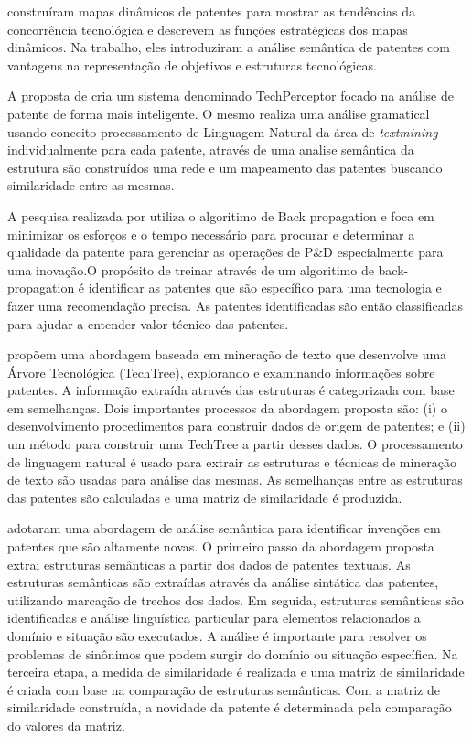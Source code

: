 \documentclass[12pt]{article}
\begin{document}
\cite{yoon2013identifying} construíram mapas dinâmicos de patentes para mostrar as tendências da concorrência tecnológica e descrevem as funções estratégicas dos mapas dinâmicos. Na trabalho, eles introduziram a análise semântica de patentes com vantagens na representação de objetivos e estruturas tecnológicas. 

A proposta de \citep{park2013patent} cria um sistema denominado TechPerceptor focado na análise de patente de forma mais inteligente. O mesmo realiza uma análise gramatical usando conceito processamento de Linguagem Natural da área de \textit{textmining} individualmente para cada patente, através de uma analise semântica da estrutura são construídos uma rede e um mapeamento das patentes buscando similaridade entre as mesmas.

A pesquisa realizada por \cite{trappey2013intelligent} utiliza o algoritimo de Back propagation e foca em
minimizar os esforços e o tempo necessário para procurar e determinar a qualidade da patente para gerenciar as operações de P\&D especialmente para uma inovação.O propósito de treinar através de um algoritimo de back-propagation é identificar as patentes que são
específico para uma tecnologia e fazer uma recomendação precisa.
As patentes identificadas são então classificadas para ajudar a entender valor técnico das patentes.

\cite{choi2012sao} propõem uma abordagem baseada em  mineração de texto que desenvolve uma Árvore Tecnológica (TechTree), explorando e examinando informações sobre patentes.
A informação extraída através das estruturas é categorizada com base em semelhanças. Dois importantes processos da abordagem proposta são: (i) o desenvolvimento procedimentos para construir dados de origem de patentes; e (ii) um método para construir uma TechTree a partir desses dados. O processamento de linguagem   natural é usado para extrair as estruturas e técnicas de mineração de texto são usadas para análise das mesmas. As semelhanças entre as estruturas das patentes são calculadas e uma matriz de similaridade é produzida.

\cite{gerken2012new} adotaram uma abordagem de análise semântica para identificar invenções em patentes que são altamente novas.
O primeiro passo da abordagem proposta extrai estruturas semânticas a partir dos dados de patentes textuais. As estruturas semânticas são extraídas através da análise sintática das patentes, utilizando marcação de trechos dos dados.
Em seguida, estruturas semânticas são identificadas e análise linguística particular para elementos relacionados a domínio e situação são executados.
A análise é importante para resolver os problemas de sinônimos que podem surgir do domínio ou situação específica. Na terceira etapa, a medida de similaridade é realizada e uma matriz de similaridade é criada com base na comparação de estruturas semânticas. Com a matriz de similaridade construída, a novidade da patente é determinada pela comparação do valores da matriz.
\end{document}
